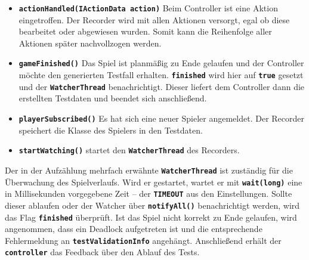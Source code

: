 \documentclass[
							a4paper, 
							11pt, 
							openany, 
							liststotoc,
							parskip=half, 
   							headings=normal
						]{scrreprt}
\begin{document}
{\begin{itemize}
	\item \textbf{\texttt{actionHandled(IActionData action)}} Beim Controller ist eine Aktion eingetroffen. Der Recorder wird mit allen Aktionen versorgt, egal ob diese bearbeitet oder abgewiesen wurden. Somit kann die Reihenfolge aller Aktionen später nachvollzogen werden.
	\item \textbf{\texttt{gameFinished()}} Das Spiel ist planmäßig zu Ende gelaufen und der Controller möchte den generierten Testfall erhalten. \textbf{\texttt{finished}} wird hier auf \textbf{\texttt{true}} gesetzt und der \textbf{\texttt{WatcherThread}} benachrichtigt. Dieser liefert dem Controller dann die erstellten Testdaten und beendet sich anschließend.
	\item \textbf{\texttt{playerSubscribed()}} Es hat sich eine neuer Spieler angemeldet. Der Recorder speichert die Klasse des Spielers in den Testdaten.
	\item \textbf{\texttt{startWatching()}} startet den \textbf{\texttt{WatcherThread}} des Recorders. 
\end{itemize}\bigskip

Der in der Aufzählung mehrfach erwähnte \textbf{\texttt{WatcherThread}} ist zuständig für die Über\-wach\-ung des Spielverlaufs. Wird er gestartet, wartet er mit \textbf{\texttt{wait(long)}} eine in Millisekunden vorgegebene Zeit -- der \textbf{\texttt{TIMEOUT}} aus den Einstellungen. Sollte dieser ablaufen oder der Watcher über \textbf{\texttt{notifyAll()}} benachrichtigt werden, wird das Flag \textbf{\texttt{finished}} überprüft. Ist das Spiel nicht korrekt zu Ende gelaufen, wird angenommen, dass ein Deadlock aufgetreten ist und die entsprechende Fehlermeldung an \textbf{\texttt{testValidationInfo}} angehängt. Anschließend erhält der \textbf{\texttt{controller}} das Feedback über den Ablauf des Tests.

\clearpage

}
\end{document}
